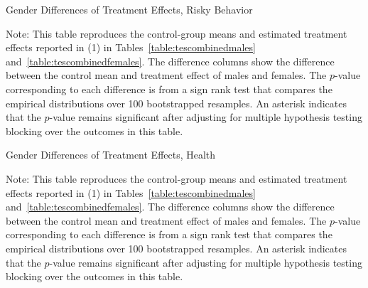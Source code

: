 \begin{table}[!htbp]
\centering
\begin{adjustbox}{width=\textwidth}
\begin{threeparttable}
\caption{Gender Differences of Treatment Effects, Risky Behavior}
\begin{scriptsize}

\end{scriptsize}
\begin{tablenotes}
\footnotesize
Note: This table reproduces the control-group means and estimated treatment effects reported in (1) in Tables~\ref{table:tescombinedmales} and~\ref{table:tescombinedfemales}. The difference columns show the difference between the control mean and treatment effect of males and females. The $p$-value corresponding to each difference is from a sign rank test that compares the empirical distributions over 100 bootstrapped resamples. An asterisk indicates that the $p$-value remains significant after adjusting for multiple hypothesis testing blocking over the outcomes in this table.
\end{tablenotes}
\end{threeparttable}
\end{adjustbox}
\end{table}

\begin{table}[!htbp]
\centering
\begin{threeparttable}
\caption{Gender Differences of Treatment Effects, Health}
\begin{scriptsize}

\end{scriptsize}
\begin{tablenotes}
\scriptsize
Note: This table reproduces the control-group means and estimated treatment effects reported in (1) in Tables~\ref{table:tescombinedmales} and~\ref{table:tescombinedfemales}. The difference columns show the difference between the control mean and treatment effect of males and females. The $p$-value corresponding to each difference is from a sign rank test that compares the empirical distributions over 100 bootstrapped resamples. An asterisk indicates that the $p$-value remains significant after adjusting for multiple hypothesis testing blocking over the outcomes in this table.
\end{tablenotes}
\end{threeparttable}
\end{table}

